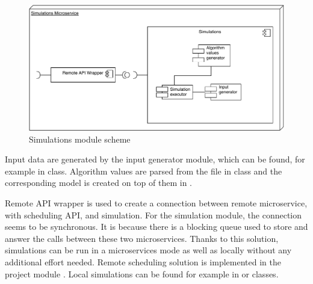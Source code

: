 \begin{figure}[ht]
    \includegraphics[width=\textwidth]{i_simulations.pdf}
    \centering
    \caption{Simulations module scheme}
    \label{fig:simulations-arch}
\end{figure}

Input data are generated by the input generator module,
which can be found, for example in  class.
Algorithm values are parsed from the file in class  
and the corresponding model is created on top of them in .

Remote API wrapper is used to create a connection between remote microservice, with scheduling API, and simulation.
For the simulation module,
the connection seems to be synchronous.
It is because there is a blocking queue used to store and answer the calls between these two microservices.
Thanks to this solution,
simulations can be run in a microservices mode as well as locally without any additional effort needed.
Remote scheduling solution is implemented in the project module .
Local simulations can be found for example in  or  classes.